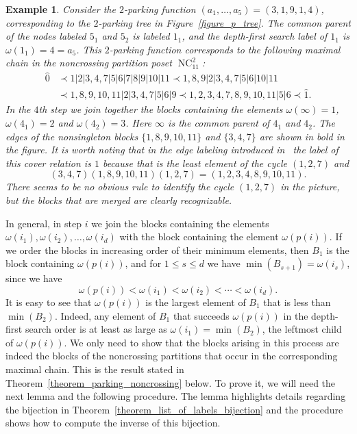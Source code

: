 \documentclass[11pt]{amsart}
\newtheorem{example}[theorem]{Example}
\numberwithin{equation}{section}
\newcommand{\hz}{\widehat{0}}
\newcommand{\ho}{\widehat{1}}
\newcommand{\coveredby}{\prec}
\DeclareMathOperator{\NC}{NC}
\begin{document}
\begin{example}
\label{example_chain}  
{\rm
Consider the $2$-parking function $(a_{1}, \ldots, a_{5}) = (3,1,9,1,4)$,
corresponding to the $2$-parking tree in Figure~\ref{figure_p_tree}.
The common parent of the nodes labeled $5_{1}$ and $5_{2}$ is
labeled $1_{1}$, and the depth-first search label of $1_{1}$ is
$\omega(1_{1}) = 4 = a_{5}$. This $2$-parking function 
corresponds to the following maximal chain in the noncrossing partition
poset $\NC^{2}_{11}$: 
\begin{align*}
\hz
& \coveredby
1|2|3,4,7|5|6|7|8|9|10|11
\coveredby
1,8,9|2|3,4,7|5|6|10|11\\
& \coveredby
1,8,9,10,11|2|3,4,7|5|6|9
\coveredby
1,2,3,4,7,8,9,10,11|5|6
\coveredby
\ho .
\end{align*}
In the $4$th step we join together the blocks containing the elements
$\omega(\infty) = 1$,
$\omega(4_{1}) = 2$ and
$\omega(4_{2}) = 3$.
Here $\infty$ is the common parent of $4_{1}$ and $4_{2}$. The
edges of the nonsingleton blocks $\{1,8,9,10,11\}$ and $\{3,4,7\}$ are
shown in bold in the figure. 
It is worth noting that in the edge labeling introduced
in~\cite{Muhle_Nadeau_Williams} the label of this cover relation is $1$
because that is the least element of the cycle $(1,2,7)$ and
$$
(3,4,7)(1,8,9,10,11)(1,2,7)=(1,2,3,4,8,9,10,11). 
$$
There seems to be no obvious rule to identify the cycle $(1,2,7)$ in the
picture, but the blocks that are merged are clearly recognizable. 
}
\end{example}
In general, in step $i$ we join the blocks
containing the elements $\omega(i_1),\omega(i_2),\ldots,\omega(i_d)$
with the block containing the element $\omega(p(i))$. If we order the
blocks in increasing order of their minimum elements, then $B_1$ is the
block containing $\omega(p(i))$, and for $1\leq s\leq d$ we have $\min
(B_{s+1})=\omega(i_{s})$, since we have
$$\omega(p(i))<\omega(i_1)<\omega(i_2)<\cdots< \omega(i_d).$$
It is easy to see that $\omega(p(i))$ is the largest element of $B_1$ that
is less than $\min(B_2)$. Indeed, any element of $B_1$ that succeeds
$\omega(p(i))$ in the depth-first search order is at least as large as
$\omega(i_1)=\min(B_2)$, the leftmost child of $\omega(p(i))$. We only
need to show that the blocks arising in this process are indeed the blocks of
the noncrossing partitions that occur in the corresponding maximal
chain. This is the result stated in
Theorem~\ref{theorem_parking_noncrossing} below. To prove it, we will
need the next lemma and the following procedure. 
The lemma highlights details regarding the
bijection in Theorem~\ref{theorem_list_of_labels_bijection}
and the procedure shows how to compute the inverse of this bijection.
 
\end{document}
